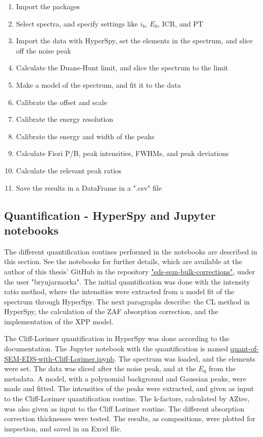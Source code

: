 \begin{enumerate}
    \item Import the packages
    \item Select spectra, and specify settings like $i_b$, $E_0$, ICR, and PT
    \item Import the data with HyperSpy, set the elements in the spectrum, and slice off the noise peak
    \item Calculate the Duane-Hunt limit, and slice the spectrum to the limit
    \item Make a model of the spectrum, and fit it to the data
    \item Calibrate the offset and scale
    \item Calibrate the energy resolution
    \item Calibrate the energy and width of the peaks
    \item Calculate Fiori P/B, peak intensities, FWHMs, and peak deviations
    \item Calculate the relevant peak ratios
    \item Save the results in a DataFrame in a ".csv" file
\end{enumerate}










\subsection{Quantification - HyperSpy and Jupyter notebooks}
\label{method:data_treatment:quantification}

The different quantification routines performed in the notebooks are described in this section.
See the notebooks for further details, which are available at the author of this thesis' GitHub in the repository \href{https://github.com/brynjarmorka/eds-sem-bulk-corrections}{"eds-sem-bulk-corrections"}, under the user "brynjarmorka".
The initial quantification was done with the intensity ratio method, where the intensities were extracted from a model fit of the spectrum through HyperSpy.
The next paragraphs describe: the CL method in HyperSpy, the calculation of the ZAF absorption correction, and the implementation of the XPP model.

The Cliff-Lorimer quantification in HyperSpy was done according to the documentation.
The Jupyter notebook with the quantification is named \href{https://github.com/brynjarmorka/eds-sem-bulk-corrections/blob/main/quant-of-SEM-EDS-with-Cliff-Lorimer.ipynb}{quant-of-SEM-EDS-with-Cliff-Lorimer.ipynb}.
The spectrum was loaded, and the elements were set.
The data was sliced after the noise peak, and at the $E_0$ from the metadata.
A model, with a polynomial background and Gaussian peaks, were made and fitted.
The intensities of the peaks were extracted, and given as input to the Cliff-Lorimer quantification routine.
The k-factors, calculated by AZtec, was also given as input to the Cliff Lorimer routine.
The different absorption correction thicknesses were tested.
The results, as compositions, were plotted for inspection, and saved in an Excel file.

